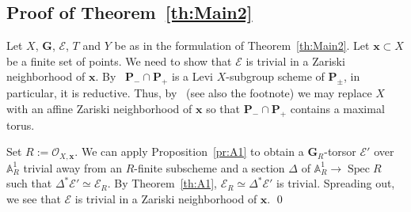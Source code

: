 \documentclass[11pt]{amsart}
\newcommand\A{\mathbb A}
\DeclareMathOperator\Spec{{Spec}}
\theoremstyle{plain}
\theoremstyle{definition}
\theoremstyle{remark}
\newcommand\cE{{\mathcal{E}}}
\newcommand\cO{{\mathcal{O}}}
\newcommand\bG{{\mathbf G}}
\newcommand\bP{{\mathbf P}}
\newcommand\bx{{\mathbf x}}
\begin{document}
\subsection{Proof of Theorem~\ref{th:Main2}}\label{Sect:Proof}
Let $X$, $\bG$, $\cE$, $T$ and $Y$ be as in the formulation of Theorem~\ref{th:Main2}. Let $\bx\subset X$ be a finite set of points. We need to show that $\cE$ is trivial in a Zariski neighborhood of $\bx$. By~\cite[Exp.~XXVI, thm.~4.3.2(b)]{SGA3-3} $\bP_-\cap\bP_+$ is a Levi $X$-subgroup scheme of $\bP_\pm$, in particular, it is reductive. Thus, by~\cite[Exp.~XIV, cor.~3.20]{SGA3-3} (see also the footnote) we may replace $X$ with an affine Zariski neighborhood of $\bx$ so that $\bP_-\cap\bP_+$ contains a maximal torus.

Set $R:=\cO_{X,\bx}$. We can apply Proposition~\ref{pr:A1} to obtain a $\bG_R$-torsor $\cE'$ over $\A^1_R$ trivial away from an $R$-finite subscheme and a section $\Delta$ of $\A_R^1\to\Spec R$ such that $\Delta^*\cE'\simeq\cE_R$. By Theorem~\ref{th:A1}, $\cE_R\simeq\Delta^*\cE'$ is trivial. Spreading out, we see that $\cE$ is trivial in a Zariski neighborhood of $\bx$. \qed



\end{document}
